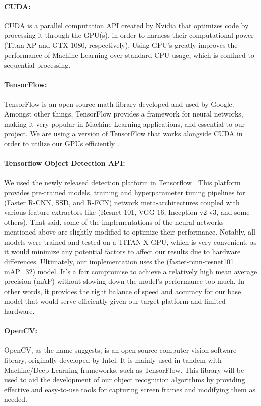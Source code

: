 \paragraph{CUDA:} CUDA is a parallel computation API created by Nvidia that optimizes code by processing it through the GPU(s), in order to harness their computational power (Titan XP and GTX 1080, respectively).  Using GPU's greatly improves the performance of Machine Learning over standard CPU usage, which is confined to sequential processing.
\par

\paragraph{TensorFlow:} TensorFlow is an open source math library developed and used by Google.  Amongst other things, TensorFlow provides a framework for neural networks, making it very popular in Machine Learning applications, and essential to our project.  We are using a version of TensorFlow that works alongside CUDA in order to utilize our GPUs efficiently \cite{Tensorflow}. 
\par

\paragraph{Tensorflow Object Detection API: } We used the newly released detection platform in Tensorflow \cite{Speed-accuracy-trade-offs}. This platform provides pre-trained models, training and hyperparameter tuning pipelines for (Faster R-CNN, SSD, and R-FCN) network meta-architectures coupled with various feature extractors like (Resnet-101, VGG-16, Inception v2-v3, and some others). That said, some of the implementations of the neural networks mentioned above are slightly modified to optimize their performance. Notably, all models were trained and tested on a TITAN X GPU, which is very convenient, as it would minimize any potential factors to affect our results due to hardware differences. Ultimately, our implementation uses the (faster-rcnn-resnet101 | mAP=32) model. It's a fair compromise to achieve a relatively high mean average precision (mAP) without slowing down the model's performance too much. In other words, it provides the right balance of speed and accuracy for our base model that would serve efficiently given our target platform and limited hardware.
\par


\paragraph{OpenCV:} OpenCV, as the name suggests, is an open source computer vision software library, originally developed by Intel.  It is mainly used in tandem with Machine/Deep Learning frameworks, such as TensorFlow.  This library will be used to aid the development of our object recognition algorithms by providing effective and easy-to-use tools for capturing screen frames and modifying them as needed.  
\par


